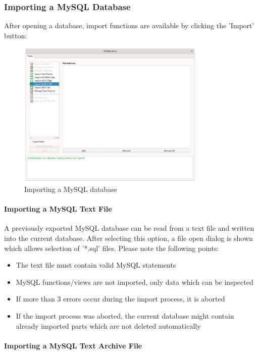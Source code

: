 \subsubsection{Importing a MySQL Database}

After opening a database, import functions are available by clicking the 'Import' button:

\begin{figure}[H]
  \center
    \includegraphics[width=9cm,frame]{../screenshots/database_import.png}
  \caption{Importing a MySQL database}
\end{figure}

\paragraph{Importing a MySQL Text File}

A previously exported MySQL database can be read from a text file and written into the current database. After selecting this option, a file open dialog is shown which allows selection of '*.sql' files. Please note the following points:

\begin{itemize}  
\item The text file must contain valid MySQL statements
\item MySQL functions/views are not imported, only data which can be inspected
\item If more than 3 errors occur during the import process, it is aborted
\item If the import process was aborted, the current database might contain already imported parts which are not deleted automatically
\end{itemize}

\paragraph{Importing a MySQL Text Archive File}

